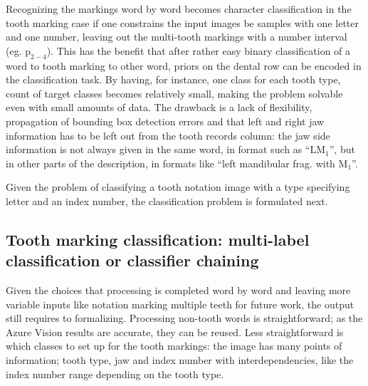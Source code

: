 \documentclass[english,twoside,openright]{UH_DS_MSc}
\begin{document}
Recognizing the markings word by word becomes character classification in 
the tooth marking case if one constrains the input images be samples with one letter and 
one number, leaving out the multi-tooth markings with a number interval (eg. $\text{p}_{2-4}$).
This has the benefit that after rather easy binary classification of a word to 
tooth marking to other word, priors on the dental row can be encoded in the classification
task. By having, for instance, one class for each tooth type, count of target classes becomes
relatively small, making the problem solvable even with small amounts of data.
The drawback is a lack of flexibility, propagation of 
bounding box detection errors and that left and right jaw information has to be left out from 
the tooth records column: the jaw side information is not always given in the same word, 
in format such as ``$\text{LM}_1$'', but in other parts of the description, in formats like
 ``left mandibular frag. with $\text{M}_1$''.

Given the problem of classifying a tooth notation image with a type specifying letter and an index 
number, the classification problem is formulated next.

\subsection{Tooth marking classification: multi-label classification or classifier chaining}

Given the choices that processing is completed word by word and leaving more variable inputs like 
notation marking multiple teeth for future work, the output still requires to formalizing.
Processing non-tooth words is straightforward; as the Azure Vision results are accurate, they
can be reused. Less straightforward is which classes to set up for the 
tooth markings: the image has many points of information; tooth type, jaw and index number with 
interdependencies, like the index number range depending on the tooth type.
\end{document}
